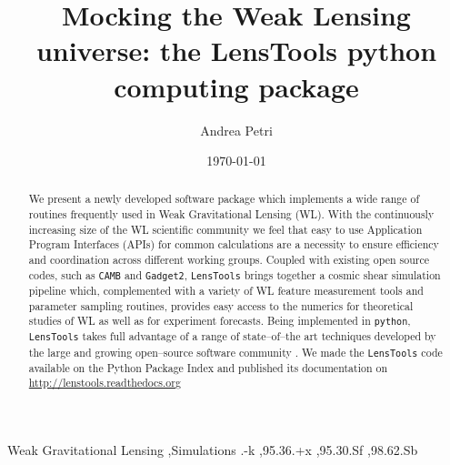 \documentclass[5p]{elsarticle}
\newcommand{\ttt}[1]{\texttt{#1}}
\newcommand{\LT}{\texttt{LensTools} }
\begin{document}
\title{Mocking the Weak Lensing universe: the LensTools python computing package}

\author[cu,bnl]{Andrea Petri}

\address[cu]{Department of Physics, Columbia University, New York, NY 10027, USA}
\address[bnl]{Physics Department, Brookhaven National Laboratory, Upton, NY 11973, USA}

\date{\today}

\label{firstpage}

\begin{abstract}
We present a newly developed software package which implements a wide range of routines frequently used in Weak Gravitational Lensing (WL). With the continuously increasing size of the WL scientific community we feel that easy to use Application Program Interfaces (APIs) for common calculations are a necessity to ensure efficiency and coordination across different working groups. Coupled with existing open source codes, such as \ttt{CAMB}\citep{CAMB} and \ttt{Gadget2}\citep{Gadget2}, \LT brings together a cosmic shear simulation pipeline which, complemented with a variety of WL feature measurement tools and parameter sampling routines, provides easy access to the numerics for theoretical studies of WL as well as for experiment forecasts. Being implemented in \ttt{python}\citep{python}, \LT takes full advantage of a range of state--of--the art techniques developed by the large and growing open--source software community \citep{scipy,pandas,astropy,scikit-learn,emcee}. We made the \LT code available on the Python Package Index and published its documentation on \url{http://lenstools.readthedocs.org}      
    
\end{abstract}

\begin{keyword}
Weak Gravitational Lensing \sep Simulations
.-k \sep 95.36.+x \sep 95.30.Sf \sep 98.62.Sb
\end{keyword}

\maketitle


\end{document}
